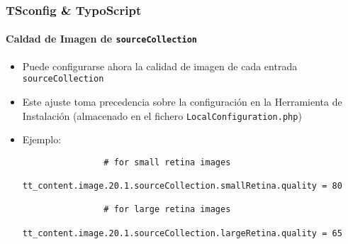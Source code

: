 \begin{frame}[fragile]
	\frametitle{TSconfig \& TypoScript}
	\framesubtitle{Caldad de Imagen de \texttt{sourceCollection}}

	\lstset{basicstyle=\tiny\ttfamily}

	\begin{itemize}

		\item Puede configurarse ahora la calidad de imagen de cada entrada \texttt{sourceCollection}

		\item Este ajuste toma precedencia sobre la configuración en la Herramienta de Instalación\newline
			(almacenado en el fichero \texttt{LocalConfiguration.php})

		\item Ejemplo:

			\begin{lstlisting}
				# for small retina images
				tt_content.image.20.1.sourceCollection.smallRetina.quality = 80

				# for large retina images
				tt_content.image.20.1.sourceCollection.largeRetina.quality = 65
			\end{lstlisting}

	\end{itemize}

\end{frame}


